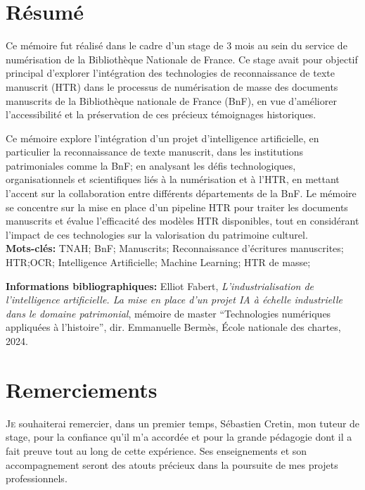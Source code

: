 \documentclass[a4paper,12pt,twoside]{book}
\begin{document}
	\chapter{Résumé}
\medskip
Ce mémoire fut réalisé dans le cadre d'un stage de 3 mois au sein du service de numérisation de la Bibliothèque Nationale de France. Ce stage avait pour objectif principal d'explorer l'intégration des technologies de reconnaissance de texte manuscrit (HTR) dans le processus de numérisation de masse des documents manuscrits de la Bibliothèque nationale de France  (BnF), en vue d'améliorer l'accessibilité et la préservation de ces précieux témoignages historiques.
	
Ce mémoire explore l'intégration d'un projet d'intelligence artificielle, en particulier la reconnaissance de texte manuscrit, dans les institutions patrimoniales comme la BnF; en analysant les défis technologiques, organisationnels et scientifiques liés à la numérisation et à l’HTR, en mettant l’accent sur la collaboration entre différents départements de la BnF. Le mémoire se concentre sur la mise en place d’un pipeline HTR pour traiter les documents manuscrits et évalue l’efficacité des modèles HTR disponibles, tout en considérant l’impact de ces technologies sur la valorisation du patrimoine culturel. \\	
	
	\textbf{Mots-clés:} TNAH; BnF; Manuscrits; Reconnaissance d'écritures manuscrites; HTR;OCR; Intelligence Artificielle; Machine Learning; HTR de masse;
	
	\textbf{Informations bibliographiques:} Elliot Fabert, \textit{L'industrialisation de l'intelligence artificielle. La mise en place d'un projet IA à échelle industrielle dans le domaine patrimonial}, mémoire de master \enquote{Technologies numériques appliquées à l'histoire}, dir. Emmanuelle Bermès, École nationale des chartes, 2024.
	
		\newpage{\pagestyle{empty}\cleardoublepage}
	
	\chapter{Remerciements}
	
\lettrine{J}e souhaiterai remercier, dans un premier temps, Sébastien Cretin, mon tuteur de stage, pour la confiance qu’il m’a accordée et pour la grande pédagogie dont il a fait preuve tout au long de cette expérience. Ses enseignements et son accompagnement seront des atouts précieux dans la poursuite de mes projets professionnels.
\end{document}
